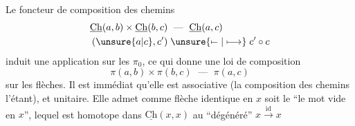Le foncteur de composition des chemins
\[
\begin{aligned}
\underline{\mathrm{Ch}}(a,b)\times\underline{\mathrm{Ch}}(b,c)&\;\text{ --- }\;\underline{\mathrm{Ch}}(a,c)\\
(\unsure{a|c},c')&\;\unsure{\mathrel{\mapstochar\relbar}|\longmapsto}\;c'\circ c
\end{aligned}
\]
induit une  application sur les $\pi_0$, ce qui donne une loi de composition
\[
\pi(a,b)\times\pi(b,c)\;\text{ --- }\;\pi(a,c)
\]
sur les flèches. Il est immédiat qu'elle est associative (la composition des chemins l'étant), et unitaire. Elle admet comme flèche identique en $x$ soit le   ``le mot vide en $x$'', lequel est  homotope dans $\underline{\mathrm{Ch}}(x,x)$ au  ``dégénéré'' $x\xrightarrow{\mathrm{id}}x$
